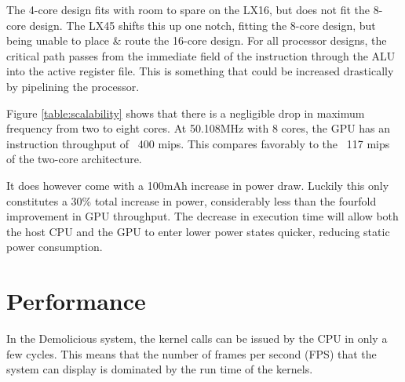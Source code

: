 \documentclass[../main/report.tex]{subfiles}
\begin{document}
The 4-core design fits with room to spare on the LX16, but does not fit the 8-core design.
The LX45 shifts this up one notch, fitting the 8-core design, but being unable to place \& route the 16-core design.
For all processor designs, the critical path passes from the immediate field of the instruction through the ALU into the active register file.
This is something that could be increased drastically by pipelining the processor.

Figure \ref{table:scalability} shows that there is a negligible drop in maximum frequency from two to eight cores.
At 50.108MHz with 8 cores, the GPU has an instruction throughput of ~400 mips.
This compares favorably to the ~117 mips of the two-core architecture.

It does however come with a 100mAh increase in power draw.
Luckily this only constitutes a 30\% total increase in power, considerably less than the fourfold improvement in GPU throughput.
The decrease in execution time will allow both the host CPU and the GPU to enter lower power states quicker, reducing static power consumption.

\section{Performance}

In the Demolicious system, the kernel calls can be issued by the CPU in only a few cycles.
This means that the number of frames per second (FPS) that the system can display is dominated by the run time of the kernels.
\end{document}
